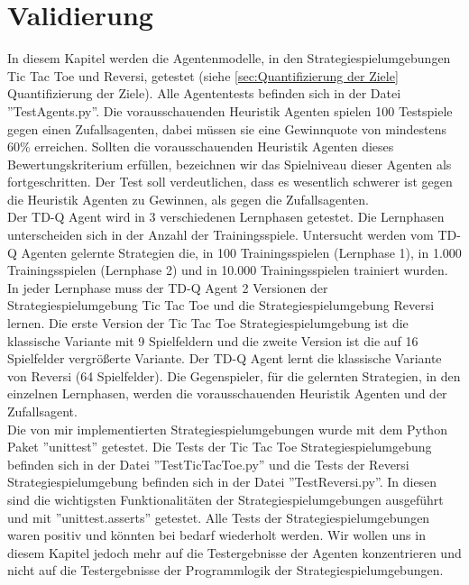\chapter{Validierung}
\label{cha:Validierung}

In diesem Kapitel werden die Agentenmodelle, in den Strategiespielumgebungen Tic Tac Toe und Reversi, getestet (siehe \ref{sec:Quantifizierung der Ziele} Quantifizierung der Ziele). Alle Agententests befinden sich in der Datei ''TestAgents.py''. Die vorausschauenden Heuristik Agenten spielen 100 Testspiele gegen einen Zufallsagenten, dabei müssen sie eine Gewinnquote von mindestens 60\% erreichen. Sollten die vorausschauenden Heuristik Agenten dieses Bewertungskriterium erfüllen, bezeichnen wir das Spielniveau dieser Agenten als fortgeschritten. Der Test soll verdeutlichen, dass es wesentlich schwerer ist gegen die Heuristik Agenten zu Gewinnen, als gegen die Zufallsagenten. \\

Der TD-Q Agent wird in 3 verschiedenen Lernphasen getestet. Die Lernphasen unterscheiden sich in der Anzahl der Trainingsspiele. Untersucht werden vom TD-Q Agenten gelernte Strategien die, in 100 Trainingsspielen (Lernphase 1), in 1.000 Trainingsspielen (Lernphase 2) und in 10.000 Trainingsspielen trainiert wurden. In jeder Lernphase muss der TD-Q Agent 2 Versionen der Strategiespielumgebung Tic Tac Toe und die Strategiespielumgebung Reversi lernen. Die erste Version der Tic Tac Toe Strategiespielumgebung ist die klassische Variante mit 9 Spielfeldern und die zweite Version ist die auf 16 Spielfelder vergrößerte Variante. Der TD-Q Agent lernt die klassische Variante von Reversi (64 Spielfelder). Die Gegenspieler, für die gelernten Strategien, in den einzelnen Lernphasen, werden die vorausschauenden Heuristik Agenten und der Zufallsagent. \\

Die von mir implementierten Strategiespielumgebungen wurde mit dem Python Paket ''unittest'' getestet. Die Tests der Tic Tac Toe Strategiespielumgebung befinden sich in der Datei ''TestTicTacToe.py'' und die Tests der Reversi Strategiespielumgebung befinden sich in der Datei ''TestReversi.py''. In diesen sind die wichtigsten Funktionalitäten der Strategiespielumgebungen ausgeführt und mit ''unittest.asserts'' getestet. Alle Tests der Strategiespielumgebungen waren positiv und könnten bei bedarf wiederholt werden. Wir wollen uns in diesem Kapitel jedoch mehr auf die Testergebnisse der Agenten konzentrieren und nicht auf die Testergebnisse der Programmlogik der Strategiespielumgebungen. \\


